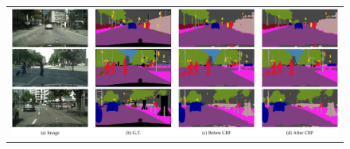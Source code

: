 \begin{figure}[!t]
  \centering
  \scalebox{1} {
  \begin{tabular}{c}
    \includegraphics[width=0.9\linewidth]{fig/cityscapes/results.jpg} \\




\end{tabular}}
\end{figure}
